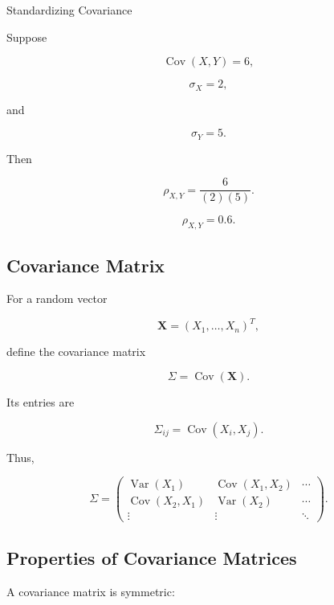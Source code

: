 \begin{workedexamplebox}{Standardizing Covariance}

Suppose

\[
\operatorname{Cov}(X,Y)=6,
\]

\[
\sigma_X=2,
\]

and

\[
\sigma_Y=5.
\]

Then

\[
\rho_{X,Y}
=
\frac6{(2)(5)}.
\]

\begin{answerbox}
\[
\boxed{
\rho_{X,Y}=0.6.
}
\]
\end{answerbox}

\end{workedexamplebox}

\subsection{Covariance Matrix}
\label{subsec:covariance-matrix}

For a random vector

\[
\mathbf{X}
=
(X_1,\ldots,X_n)^T,
\]

define the covariance matrix

\[
\boxed{
\Sigma
=
\operatorname{Cov}(\mathbf{X}).
}
\]

Its entries are

\[
\boxed{
\Sigma_{ij}
=
\operatorname{Cov}(X_i,X_j).
}
\]

Thus,

\[
\Sigma
=
\begin{pmatrix}
\operatorname{Var}(X_1)
&
\operatorname{Cov}(X_1,X_2)
&
\cdots
\\
\operatorname{Cov}(X_2,X_1)
&
\operatorname{Var}(X_2)
&
\cdots
\\
\vdots
&
\vdots
&
\ddots
\end{pmatrix}.
\]

\subsection{Properties of Covariance Matrices}
\label{subsec:covariance-matrix-properties}

A covariance matrix is symmetric:

